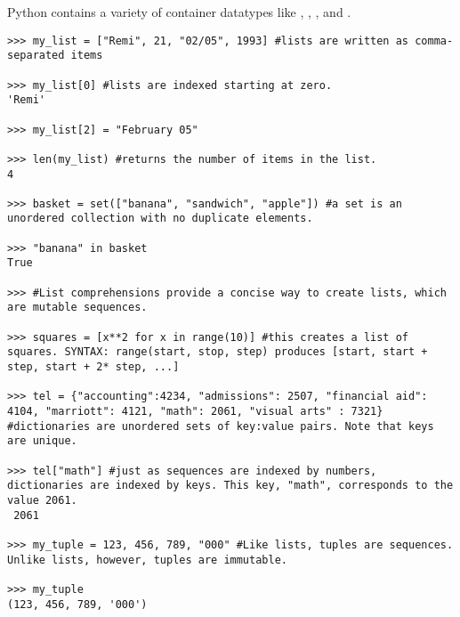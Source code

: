 \begin{example}
Python contains a variety of container datatypes like , , 
, and .

\begin{lstlisting}
>>> my_list = ["Remi", 21, "02/05", 1993] #lists are written as comma-separated items 

>>> my_list[0] #lists are indexed starting at zero.
'Remi'

>>> my_list[2] = "February 05"

>>> len(my_list) #returns the number of items in the list.
4

>>> basket = set(["banana", "sandwich", "apple"]) #a set is an unordered collection with no duplicate elements. 

>>> "banana" in basket
True

>>> #List comprehensions provide a concise way to create lists, which are mutable sequences. 

>>> squares = [x**2 for x in range(10)] #this creates a list of squares. SYNTAX: range(start, stop, step) produces [start, start + step, start + 2* step, ...]

>>> tel = {"accounting":4234, "admissions": 2507, "financial aid": 4104, "marriott": 4121, "math": 2061, "visual arts" : 7321} #dictionaries are unordered sets of key:value pairs. Note that keys are unique.

>>> tel["math"] #just as sequences are indexed by numbers, dictionaries are indexed by keys. This key, "math", corresponds to the value 2061.
 2061

>>> my_tuple = 123, 456, 789, "000" #Like lists, tuples are sequences. Unlike lists, however, tuples are immutable. 

>>> my_tuple
(123, 456, 789, '000')



\end{lstlisting}
\end{example}

